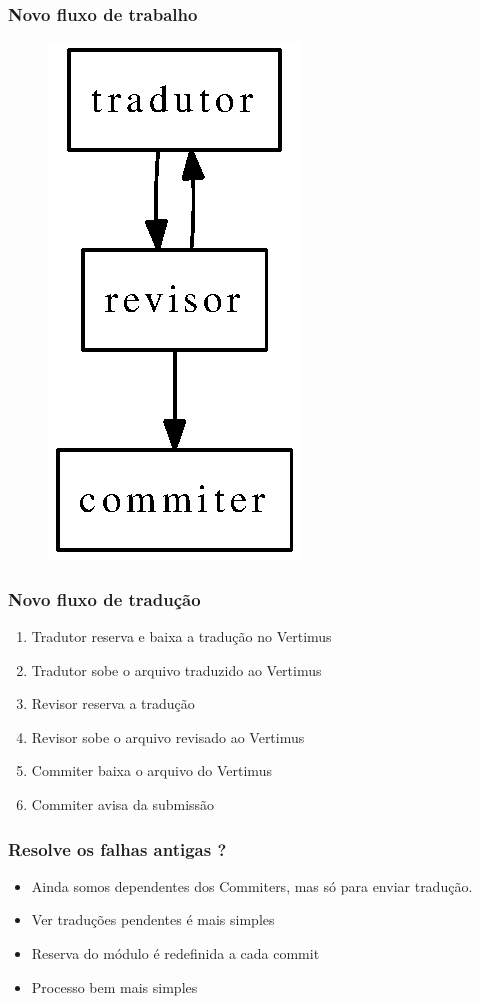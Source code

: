 \documentclass{beamer}
\begin{document}
\begin{frame}
    \frametitle{Novo fluxo de trabalho}
    \begin{figure}[ht]
        \includegraphics{figures/fluxo_novo.eps}     
    \end{figure}
\end{frame}

\begin{frame}
    \frametitle[Vertimus]{Novo fluxo de tradução}
    \begin{enumerate}[<+->]
        \item Tradutor reserva e baixa a tradução no Vertimus
        \item Tradutor sobe o arquivo traduzido ao Vertimus
        \item Revisor reserva a tradução
        \item Revisor sobe o arquivo revisado ao Vertimus
        \item Commiter baixa o arquivo do Vertimus
        \item Commiter avisa da submissão
    \end{enumerate}
\end{frame}

\begin{frame}
    \frametitle{Resolve os falhas antigas ?}
    \begin{itemize}[<+->]
        \item Ainda somos dependentes dos Commiters, mas só para enviar tradução.
        \item Ver traduções pendentes é mais simples
        \item Reserva do módulo é redefinida a cada commit
        \item Processo bem mais simples
    \end{itemize}
\end{frame}
\end{document}

